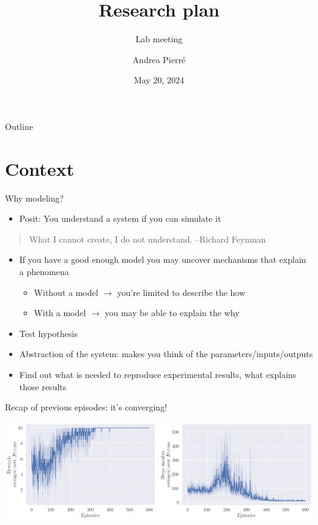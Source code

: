 \documentclass[bigger]{beamer}
\author{Andrea Pierré}
\date{May 20, 2024}
\title{Research plan}
\subtitle{Lab meeting}
\institute{Brown University}
\begin{document}
\maketitle
\begin{frame}[plain]{Outline}
\tableofcontents
\end{frame}

\section{Context }
\label{sec:orga4882f3}

\begin{frame}[<+->][label={sec:orgacd0703}]{Why modeling?}
\begin{itemize}
\item Posit: You understand a system if you can simulate it
\end{itemize}
\begin{quote}
What I cannot create, I do not understand. --Richard Feynman
\end{quote}
\begin{itemize}
\item If you have a good enough model you may uncover mechanisms that explain a phenomena
\begin{itemize}
\item Without a model \(\to\) you're limited to describe the \alert{how}
\item With a model \(\to\) you may be able to explain the \alert{why}
\end{itemize}
\item Test hypothesis
\item Abstraction of the system: makes you think of the parameters/inputs/outputs
\item Find out what is needed to reproduce experimental results, what explains those results
\end{itemize}
\end{frame}
\begin{frame}[label={sec:org13f81d1}]{Recap of previous episodes: it's converging! }
\begin{center}
\includegraphics[width=\linewidth]{img/steps-and-rewards.png}
\end{center}
\end{frame}
\end{document}
